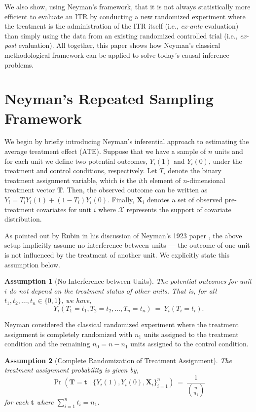 \documentclass[USenglish,onecolumn]{article}
\newcommand\cX{\mathcal{X}}
\newcommand\bX{\bm{X}}
\newcommand\bT{\bm{T}}
\newcommand\bt{\bm{t}}
\newtheorem{assumption}{Assumption}
\begin{document}
We also show, using Neyman's framework, that it is not always
statistically more efficient to evaluate an ITR by conducting a new
randomized experiment where the treatment is the administration of the
ITR itself (i.e., {\it ex-ante} evaluation) than simply using the data
from an existing randomized controlled trial (i.e., {\it ex-post}
evaluation).  All together, this paper shows how Neyman's classical
methodological framework can be applied to solve today's causal
inference problems.

\section{Neyman's Repeated Sampling Framework}

We begin by briefly introducing Neyman's inferential approach to
estimating the average treatment effect (ATE).  Suppose that we have a
sample of $n$ units and for each unit we define two potential
outcomes, $Y_i(1)$ and $Y_i(0)$, under the treatment and control
conditions, respectively. Let $T_i$ denote the binary treatment
assignment variable, which is the $i$th element of $n$-dimensional
treatment vector $\bT$.  Then, the observed outcome can be written as
$Y_i=T_iY_i(1)+(1-T_i)Y_i(0)$.  Finally, $\bX_i$ denotes a set of
observed pre-treatment covariates for unit $i$ where $\cX$ represents
the support of covariate distribution.

As pointed out by Rubin in his discussion of Neyman's 1923 paper
\cite{rubi:90}, the above setup implicitly assume no interference
between units --- the outcome of one unit is not influenced by the
treatment of another unit.  We explicitly state this assumption below.
\begin{assumption}[No Interference between Units] \label{asm:SUTVA}
	The potential outcomes for unit $i$ do not depend
	on the treatment status of other units.  That is, for all
	$t_1, t_2,\ldots,t_n \in \{0, 1\}$, we have,
	$$Y_i(T_1 = t_1, T_2 = t_2, \ldots, T_n = t_n) \ = \ Y_i(T_i = t_i).$$
\end{assumption}

Neyman considered the classical randomized experiment where the
treatment assignment is completely randomized with $n_1$ units
assigned to the treatment condition and the remaining $n_0=n-n_1$
units assigned to the control condition.
\begin{assumption}[Complete Randomization of Treatment
  Assignment] \label{asm:comrand} The
  treatment assignment probability is given by,
  $$\Pr(\bT = \bt \mid \{Y_i(1), Y_i(0), \bX_i\}_{i=1}^n ) \ = \ \frac{1}{{n \choose n_1}}$$
  for each $\bt$ where $\sum_{i=1}^n t_i = n_1$.
\end{assumption}
\end{document}
